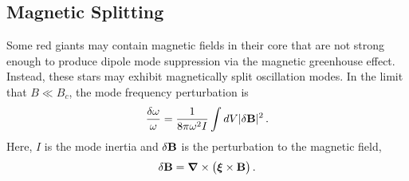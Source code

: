 \subsection{Magnetic Splitting}

Some red giants may contain magnetic fields in their core that are not strong enough to produce dipole mode suppression via the magnetic greenhouse effect. Instead, these stars may exhibit magnetically split oscillation modes. In the limit that $B \ll B_c$, the mode frequency perturbation is \citep{Unno_1989}
\begin{equation}
\label{eqn:dommag}
\frac{\delta \omega}{\omega} = \frac{1}{8 \pi \omega^2 I} \int d V | \delta {\bf B} |^2 \, .
\end{equation}
Here, $I$ is the mode inertia and  $\delta {\bf B}$ is the perturbation to the magnetic field,
\begin{equation}
\label{eqn:dB}
\delta {\bf B} = {\boldsymbol \nabla} \times \big( {\boldsymbol \xi} \times {\bf B} \big) \, .
\end{equation}